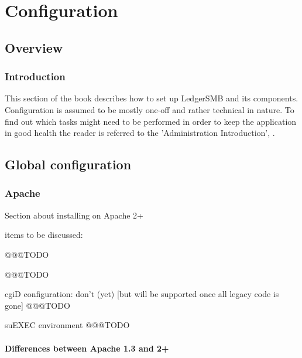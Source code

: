 
\part{Configuration}
\label{part-configuration}


\chapter{Overview}
\label{cha-configuration-overview}

\section{Introduction}
\label{sec-config-overview-introduction}
This section of the book describes how to set up LedgerSMB and its components.
Configuration  is assumed to be mostly one-off and rather technical in nature.  To find
out which tasks might need to be performed in order to keep the application in good
health the reader is referred to the 'Administration Introduction', .

\chapter{Global configuration}
\label{cha-global-configuration}

\section{Apache}
\label{sec-global-config-apache}

Section about installing on  Apache 2+

items to be discussed:

\begin{description}[style=nextline]
\item [Forwarding of authentication] @@@TODO
\item [PSGI configuration] @@@TODO
\item [performance] cgiD configuration: don't (yet) [but will be supported once all legacy code is gone] @@@TODO
\item [security] suEXEC environment @@@TODO
\end{description}

\subsection{Differences between Apache 1.3 and 2+}
\label{subsec-global-config-apache-13-vs-2}

